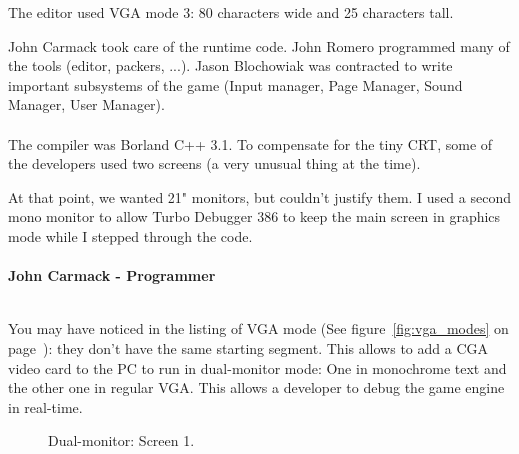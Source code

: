 \documentclass[book.tex]{subfiles}
\begin{document}
The editor used VGA mode 3: 80 characters wide and 25 characters tall.

John Carmack took care of the runtime code. John Romero programmed many of the tools (editor, packers, ...). Jason Blochowiak was contracted to write important subsystems of the game (Input manager, Page Manager, Sound Manager, User Manager).\\
\\
The compiler was Borland C++ 3.1. To compensate for the tiny CRT, some of the developers used two screens (a very unusual thing at the time).\\
\begin{fancyquotes}
At that point, we wanted 21" monitors, but couldn't justify them.  I used a second mono monitor to allow Turbo Debugger 386 to keep the main screen in graphics mode while I stepped through the code.\\
 \\
\textbf{John Carmack - Programmer}
\end{fancyquotes}
\\
You may have noticed in the listing of VGA mode (See figure~\ref{fig:vga_modes} on page~\pageref{fig:vga_modes}): they don't have the same starting segment. This allows to add a CGA video card to the PC to run in dual-monitor mode: One in monochrome text and the other one in regular VGA. This allows a developer to debug the game engine in real-time.\\
\begin{figure}[H]
\centering
\caption{Dual-monitor: Screen 1.}
\label{fig:dm1}
\end{figure}
\end{document}
